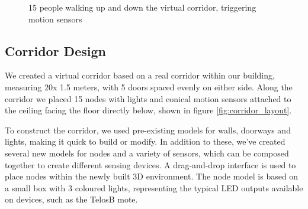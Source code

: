 \begin{figure}[t]
  \centering
  \caption{15 people walking up and down the virtual corridor, triggering motion sensors}
  \label{fig:views}
\end{figure}


\subsection{Corridor Design}
\label{sub:Constructing the corridor}
We created a virtual corridor based on a real corridor within our building, measuring 20x 1.5 meters, with 5 doors spaced evenly on either side. Along the corridor we placed 15 nodes with lights and conical motion sensors attached to the ceiling facing the floor directly below, shown in figure \ref{fig:corridor_layout}.

To construct the corridor, we used pre-existing models for walls, doorways and lights, making it quick to build or modify. In addition to these, we've created several new models for nodes and a variety of sensors, which can be composed together to create different sensing devices. A drag-and-drop interface is used to place nodes within the newly built 3D environment. The node model is based on a small box with 3 coloured lights, representing the typical LED outputs available on devices, such as the TelosB mote.

